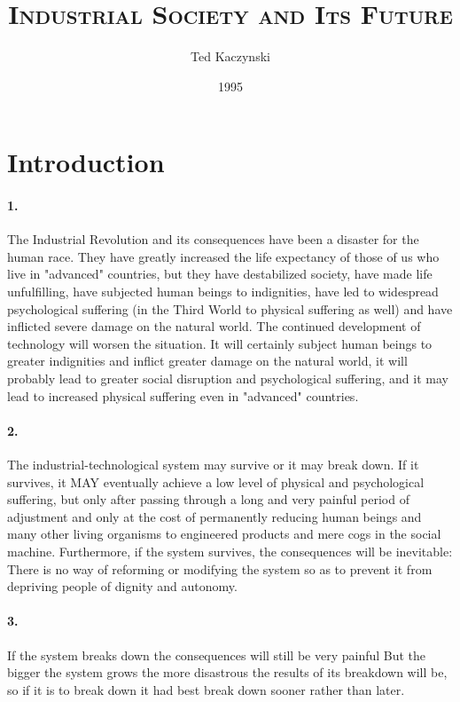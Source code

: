 \documentclass[12pt]{book}
\title{\Huge\scshape Industrial Society and Its Future}
\author{\Large Ted Kaczynski}
\date{1995}
\newcommand{\mysection}[1]{\section*{#1} \addcontentsline{toc}{section}{#1}}
\begin{document}
\begin{titlepage}
    \maketitle
\end{titlepage}
\renewcommand*\contentsname{\vspace{-2.75em}\centering \textsc{Table of Contents} \vspace{-0.5em}}
\tableofcontents


\mysection{Introduction}

\paragraph{1.} The Industrial Revolution and its consequences have been a disaster for the human race. They have greatly increased the life expectancy of those of us who live in "advanced" countries, but they have destabilized society, have made life unfulfilling, have subjected human beings to indignities, have led to widespread psychological suffering (in the Third World to physical suffering as well) and have inflicted severe damage on the natural world.  The continued development of technology will worsen the situation. It will certainly subject human beings to greater indignities and inflict greater damage on the natural world, it will probably lead to greater social disruption and psychological suffering, and it may lead to increased physical suffering even in "advanced" countries.


\paragraph{2.} The industrial-technological system may survive or it may break down. If it survives, it MAY eventually achieve a low level of physical and psychological suffering, but only after passing through a long and very painful period of adjustment and only at the cost of permanently reducing human beings and many other living organisms to engineered products and mere cogs in the social machine. Furthermore, if the system survives, the consequences will be inevitable: There is no way of reforming or modifying the system so as to prevent it from depriving people of dignity and autonomy.


\paragraph{3.} If the system breaks down the consequences will still be very painful But the bigger the system grows the more disastrous the results of its breakdown will be, so if it is to break down it had best break down sooner rather than later.
\end{document}
